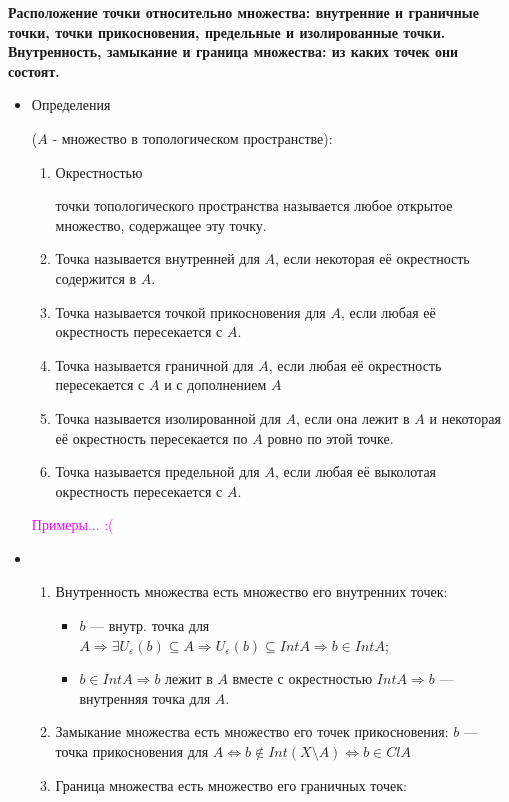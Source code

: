 \documentclass[a4paper,100pt]{article}
\theoremstyle{indented}
\begin{document}
\textbf{ Расположение точки относительно множества: внутренние и граничные точки, точки прикосновения, предельные и изолированные точки. Внутренность, замыкание и граница множества: из каких точек они состоят.}
\begin{itemize}
    \item \hypertarget{n10}{Определения}($A$ - множество в топологическом пространстве):
    \begin{enumerate}
        \item \hypertarget{n11}{Окрестностью} точки топологического пространства называется любое открытое множество, содержащее эту точку.
        \item Точка называется внутренней для $A$, если некоторая её окрестность содержится в $A$.
        \item Точка называется точкой прикосновения для $A$, если любая её окрестность пересекается с $A$.
        \item Точка называется граничной для $A$, если любая её окрестность пересекается с $A$ и с дополнением $A$
        \item Точка называется изолированной для $A$, если она лежит в $A$ и некоторая её окрестность пересекается по $A$ ровно по этой точке.
        \item Точка называется предельной для $A$, если любая её выколотая окрестность пересекается с $A$.
    \end{enumerate}
    \textcolor{magenta}{Примеры... :(}
    
    \item 
    \begin{enumerate}
        \item Внутренность множества есть множество его внутренних точек:
            \begin{itemize}
                \item $b$ --- внутр. точка для $A \Rightarrow \exists U_\varepsilon(b) \subseteq A \Rightarrow U_\varepsilon(b) \subseteq Int A  \Rightarrow b \in IntA$;
                \item $b \in Int A \Rightarrow b \text{ лежит в $A$ вместе с окрестностью } IntA \Rightarrow b$ --- внутренняя точка для $A$. 
            \end{itemize}
        \item Замыкание множества есть множество его точек прикосновения:
                $b$ --- точка прикосновения для $A \iff b \notin Int(X \setminus A) \iff b \in ClA$
        \item Граница множества есть множество его граничных точек:
        

\end{enumerate}
\end{itemize}
\end{document}

